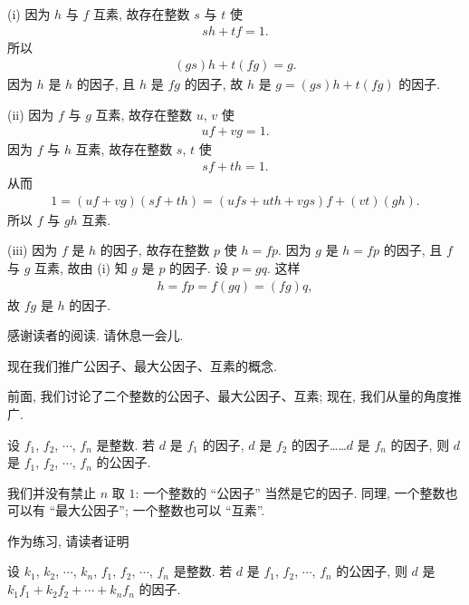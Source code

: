 \begin{pf}
    (i) 因为 $h$ 与 $f$ 互素, 故存在整数 $s$ 与 $t$ 使
    \begin{align*}
        sh + tf = 1.
    \end{align*}
    所以
    \begin{align*}
        (gs)h + t(fg) = g.
    \end{align*}
    因为 $h$ 是 $h$ 的因子, 且 $h$ 是 $fg$ 的因子, 故 $h$ 是 $g = (gs)h + t(fg)$ 的因子.

    (ii) 因为 $f$ 与 $g$ 互素, 故存在整数 $u$, $v$ 使
    \begin{align*}
        uf + vg = 1.
    \end{align*}
    因为 $f$ 与 $h$ 互素, 故存在整数 $s$, $t$ 使
    \begin{align*}
        sf + th = 1.
    \end{align*}
    从而
    \begin{align*}
        1 = (uf + vg)(sf + th) = (ufs + uth + vgs)f + (vt)(gh).
    \end{align*}
    所以 $f$ 与 $gh$ 互素.

    (iii) 因为 $f$ 是 $h$ 的因子, 故存在整数 $p$ 使 $h = fp$. 因为 $g$ 是 $h = fp$ 的因子, 且 $f$ 与 $g$ 互素, 故由 (i) 知 $g$ 是 $p$ 的因子. 设 $p = gq$. 这样
    \begin{align*}
        h = fp = f(gq) = (fg)q,
    \end{align*}
    故 $fg$ 是 $h$ 的因子.
\end{pf}

感谢读者的阅读. 请休息一会儿.

\myLine

现在我们推广公因子、最大公因子、互素的概念.

前面, 我们讨论了二个整数的公因子、最大公因子、互素; 现在, 我们从量的角度推广.

\begin{definition}
    设 $f_1$, $f_2$, $\cdots$, $f_n$ 是整数. 若 $d$ 是 $f_1$ 的因子, $d$ 是 $f_2$ 的因子……$d$ 是 $f_n$ 的因子, 则 $d$ 是 $f_1$, $f_2$, $\cdots$, $f_n$ 的公因子.
\end{definition}

\begin{remark}
    我们并没有禁止 $n$ 取 $1$: 一个整数的 ``公因子'' 当然是它的因子. 同理, 一个整数也可以有 ``最大公因子''; 一个整数也可以 ``互素''.
\end{remark}

作为练习, 请读者证明
\begin{proposition}
    设 $k_1$, $k_2$, $\cdots$, $k_n$, $f_1$, $f_2$, $\cdots$, $f_n$ 是整数. 若 $d$ 是 $f_1$, $f_2$, $\cdots$, $f_n$ 的公因子, 则 $d$ 是 $k_1 f_1 + k_2 f_2 + \cdots + k_n f_n$ 的因子.
\end{proposition}

